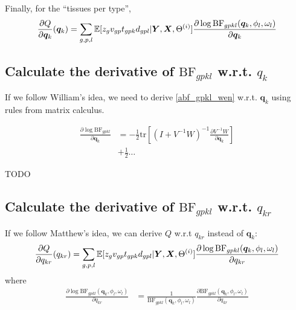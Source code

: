 \documentclass[10pt]{article}
\newcommand{\Exp}{\mathbb{E}} %
\newcommand{\BF}{{\text{BF}}} %
\newcommand{\tr}{{\text{tr}}}
\newcommand{\Xv}{\mbox{\boldmath$X$}}
\newcommand{\Yv}{\mbox{\boldmath$Y$}}
\begin{document}
Finally, for the ``tissues per type'',
\begin{equation}
  \begin{aligned}
    \frac{\partial Q}{\partial \bm{q}_k}(\bm{q}_k) = \sum_{g,p,l} \Exp[z_g v_{gp} t_{gpk} d_{gpl} | \Yv, \Xv, \Theta^{(i)}] \frac{\partial \log \BF_{gpkl}(\bm{q}_k,\phi_l,\omega_l)}{\partial \bm{q}_k}
  \end{aligned}
\end{equation}


\subsection{Calculate the derivative of $\BF_{gpkl}$ w.r.t. $q_k$}

If we follow William's idea, we need to derive \eqref{abf_gpkl_wen} w.r.t. $\bm{q}_k$ using rules from matrix calculus.

\begin{equation}
  \begin{aligned}
    \frac{\partial \log \BF_{gpkl}}{\partial \bm{q}_k} &= -\frac{1}{2} \tr \left[ (I+V^{-1}W)^{-1} \frac{\partial V^{-1}W}{\partial \bm{q}_k} \right] \\
    &+ \frac{1}{2} \ldots
  \end{aligned}
\end{equation}

TODO


\subsection{Calculate the derivative of $\BF_{gpkl}$ w.r.t. $q_{kr}$}

If we follow Matthew's idea, we can derive $Q$ w.r.t $q_{kr}$ instead of $\bm{q}_k$:
\begin{equation}
  \begin{aligned}
    \frac{\partial Q}{\partial q_{kr}}(q_{kr}) = \sum_{g,p,l} \Exp[z_g v_{gp} t_{gpk} d_{gpl} | \Yv, \Xv, \Theta^{(i)}] \frac{\partial \log \BF_{gpkl}(\bm{q}_k,\phi_l,\omega_l)}{\partial q_{kr}}
  \end{aligned}
\end{equation}
where
\begin{equation}
  \begin{aligned}
    \frac{\partial \log \BF_{gpkl}(\bm{q}_k,\phi_l,\omega_l)}{\partial q_{kr}} &= \frac{1}{\BF_{gpkl}(\bm{q}_k,\phi_l,\omega_l)} \frac{\partial \BF_{gpkl}(\bm{q}_k,\phi_l,\omega_l)}{\partial q_{kr}} \\
  \end{aligned}
\end{equation}
\end{document}
